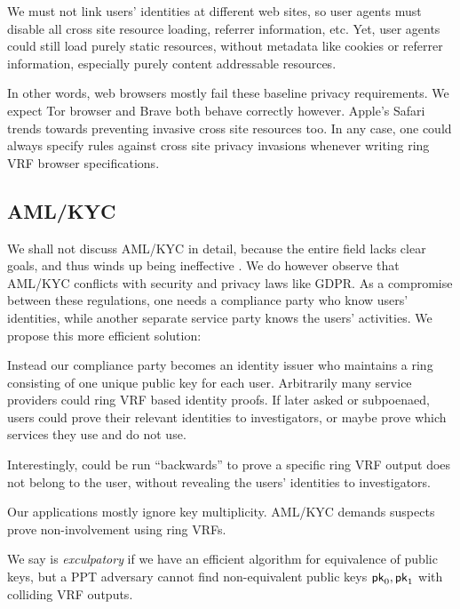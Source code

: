We must not link users' identities at different web sites, so user agents
must disable all cross site resource loading, referrer information, etc.
Yet, user agents could still load purely static resources, without metadata
like cookies or referrer information, especially purely content addressable
resources.

In other words, web browsers mostly fail these baseline privacy requirements.
We expect Tor browser and Brave both behave correctly however.
Apple's Safari trends towards preventing invasive cross site resources too.  
In any case, one could always specify rules against cross site privacy invasions
whenever writing ring VRF browser specifications.


\subsection{AML/KYC}\label{subsec:AML_KYC}

We shall not discuss AML/KYC in detail, because the entire field lacks
clear goals, and thus winds up being ineffective
 \cite{doi:10.1080/25741292.2020.1725366}.
We do however observe that AML/KYC conflicts with security and privacy
laws like GDPR.  As a compromise between these regulations,
one needs a compliance party who know users' identities,
 while another separate service party knows the users' activities.
We propose this more efficient solution:

Instead our compliance party becomes an identity issuer who maintains
a ring \ctx consisting of one unique public key for each user.
Arbitrarily many service providers could ring VRF based identity proofs.
If later asked or subpoenaed, users could prove their relevant identities
to investigators, or maybe prove which services they use and do not use. 

Interestingly, \PedVRF could be run ``backwards'' to prove a specific
ring VRF output does not belong to the user, without revealing the users'
identities to investigators. 

Our applications mostly ignore key multiplicity. 
AML/KYC demands suspects prove non-involvement using ring VRFs.

\begin{definition}\label{def:rvrf_exculpability}
We say \rVRF is {\em exculpatory} if we have an efficient algorithm
for equivalence of public keys, but a PPT adversary \adv cannot
find non-equivalent public keys $\mathsf{pk}_0,\mathsf{pk}_1$ with colliding VRF outputs.
\end{definition}

